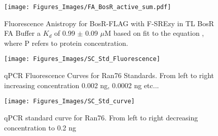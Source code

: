 \documentclass[12pt,twoside]{reedthesis}
\begin{document}
           	\begin{figure}[h]
           		\centering
           		\texttt{[image: Figures\_Images/FA\_BosR\_active\_sum.pdf]}
           		\caption[Determining DNA Activity of BosR-FLAG by Fluorescence Anistropy]{Fluorescence Anistropy for BosR-FLAG with F-SREzy in TL BosR FA Buffer  a $K_{d}$ of 0.99 $\pm$ 0.09 $\mu$M based on fit to the equation \FAstdfit , where P refers to protein concentration.}
           		\label{BosRFLAGFAactive}
           	\end{figure}
           	
           	
       		 \begin{figure}[h!tbp]
       		 	\centering
       		 	\texttt{[image: Figures\_Images/SC\_Std\_Fluorescence]}
       		 	\caption[qPCR Fluorescence Curves for Ran76 Standards]{qPCR Fluorescence Curves for Ran76 Standards. From left to right increasing concentration 0.002 ng, 0.0002 ng etc...}
       		 	\label{qPCRRan76Stds}
       		 \end{figure}
       		 
       		 
       		     		 \begin{figure}[h!tbp]
       		     		 	\centering
       		     		 	\texttt{[image: Figures\_Images/SC\_Std\_curve]}
       		     		 	\caption[qPCR Standard Curves for Ran76 Amplification]{qPCR standard curve for Ran76. From left to right decreasing concentration  to 0.2 ng}
       		     		 	\label{qPCRRan76Stdcurve}
       		     		 \end{figure}
           	
           		
    
\end{document}
